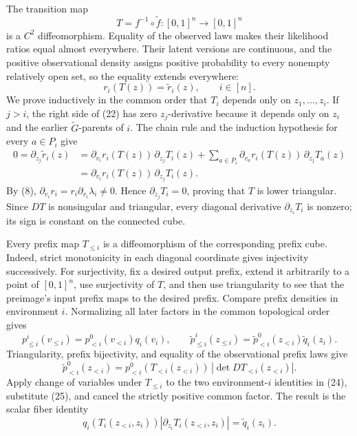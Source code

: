 The transition map
\[
 T=f^{-1}\circ\widetilde f:[0,1]^n\longrightarrow[0,1]^n
\tag{21}
\]
is a \(C^2\) diffeomorphism.  Equality of the observed laws makes their likelihood ratios equal almost everywhere.  Their latent versions are continuous, and the positive observational density assigns positive probability to every nonempty relatively open set, so the equality extends everywhere:
\[
 r_i(T(z))=\widetilde r_i(z),\qquad i\in[n].
\tag{22}
\]
We prove inductively in the common order that \(T_i\) depends only on \(z_1,\ldots,z_i\).  If \(j>i\), the right side of (22) has zero \(z_j\)-derivative because it depends only on \(z_i\) and the earlier \(\widetilde G\)-parents of \(i\).  The chain rule and the induction hypothesis for every \(a\in P_i\) give
\[
 \begin{aligned}
 0=\partial_{z_j}\widetilde r_i(z)
 &=\partial_{v_i}r_i(T(z))\,\partial_{z_j}T_i(z)
 +\sum_{a\in P_i}\partial_{v_a}r_i(T(z))\,\partial_{z_j}T_a(z)\\
 &=\partial_{v_i}r_i(T(z))\,\partial_{z_j}T_i(z).
 \end{aligned}
\tag{23}
\]
By (8), \(\partial_{v_i}r_i=r_i\partial_{v_i}\lambda_i\ne0\).  Hence \(\partial_{z_j}T_i=0\), proving that \(T\) is lower triangular.  Since \(DT\) is nonsingular and triangular, every diagonal derivative \(\partial_{z_i}T_i\) is nonzero; its sign is constant on the connected cube.

Every prefix map \(T_{\le i}\) is a diffeomorphism of the corresponding prefix cube.  Indeed, strict monotonicity in each diagonal coordinate gives injectivity successively.  For surjectivity, fix a desired output prefix, extend it arbitrarily to a point of \([0,1]^n\), use surjectivity of \(T\), and then use triangularity to see that the preimage's input prefix maps to the desired prefix.  Compare prefix densities in environment \(i\).  Normalizing all later factors in the common topological order gives
\[
 p^i_{\le i}(v_{\le i})=p^0_{<i}(v_{<i})q_i(v_i),
 \qquad
 \widetilde p^i_{\le i}(z_{\le i})
 =\widetilde p^0_{<i}(z_{<i})\widetilde q_i(z_i).
\tag{24}
\]
Triangularity, prefix bijectivity, and equality of the observational prefix laws give
\[
 \widetilde p^0_{<i}(z_{<i})
 =p^0_{<i}(T_{<i}(z_{<i}))\,|\det DT_{<i}(z_{<i})|.
\tag{25}
\]
Apply change of variables under \(T_{\le i}\) to the two environment-\(i\) identities in (24), substitute (25), and cancel the strictly positive common factor.  The result is the scalar fiber identity
\[
 q_i(T_i(z_{<i},z_i))
 \left|\partial_{z_i}T_i(z_{<i},z_i)\right|
 =\widetilde q_i(z_i).
\tag{26}
\]

